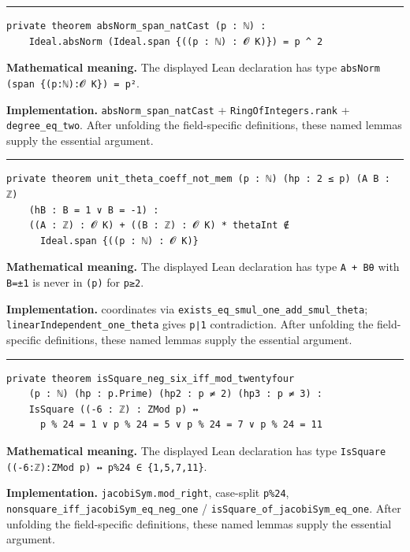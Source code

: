 \documentclass[UTF8,a4paper,11pt,fontset=fandol]{ctexart}
\theoremstyle{definition}
\newcommand{\statementsep}{\par\medskip\hrule\medskip}
\begin{document}
\statementsep
\begin{verbatim}
private theorem absNorm_span_natCast (p : ℕ) :
    Ideal.absNorm (Ideal.span {((p : ℕ) : 𝓞 K)}) = p ^ 2
\end{verbatim}
\noindent\textbf{Mathematical meaning.} The displayed Lean declaration has type \texttt{absNorm (span \{(p:ℕ):𝓞 K\}) = p²}.\par
\noindent\textbf{Implementation.} \texttt{absNorm\_\allowbreak{}span\_\allowbreak{}natCast} + \texttt{RingOfIntegers.\allowbreak{}rank} + \texttt{degree\_\allowbreak{}eq\_\allowbreak{}two}. After unfolding the field-specific definitions, these named lemmas supply the essential argument.\par
\statementsep
\begin{verbatim}
private theorem unit_theta_coeff_not_mem (p : ℕ) (hp : 2 ≤ p) (A B : ℤ)
    (hB : B = 1 ∨ B = -1) :
    ((A : ℤ) : 𝓞 K) + ((B : ℤ) : 𝓞 K) * thetaInt ∉
      Ideal.span {((p : ℕ) : 𝓞 K)}
\end{verbatim}
\noindent\textbf{Mathematical meaning.} The displayed Lean declaration has type \texttt{A + Bθ} with \texttt{B=±1} is never in \texttt{(p)} for \texttt{p≥2}.\par
\noindent\textbf{Implementation.} coordinates via \texttt{exists\_\allowbreak{}eq\_\allowbreak{}smul\_\allowbreak{}one\_\allowbreak{}add\_\allowbreak{}smul\_\allowbreak{}theta}; \texttt{linearIndependent\_\allowbreak{}one\_\allowbreak{}theta} gives \texttt{p∣1} contradiction. After unfolding the field-specific definitions, these named lemmas supply the essential argument.\par
\statementsep
\begin{verbatim}
private theorem isSquare_neg_six_iff_mod_twentyfour
    (p : ℕ) (hp : p.Prime) (hp2 : p ≠ 2) (hp3 : p ≠ 3) :
    IsSquare ((-6 : ℤ) : ZMod p) ↔
      p % 24 = 1 ∨ p % 24 = 5 ∨ p % 24 = 7 ∨ p % 24 = 11
\end{verbatim}
\noindent\textbf{Mathematical meaning.} The displayed Lean declaration has type \texttt{IsSquare ((-6:ℤ):ZMod p) ↔ p\%24 ∈ \{1,5,7,11\}}.\par
\noindent\textbf{Implementation.} \texttt{jacobiSym.\allowbreak{}mod\_\allowbreak{}right}, case-split \texttt{p\%24}, \texttt{nonsquare\_\allowbreak{}iff\_\allowbreak{}jacobiSym\_\allowbreak{}eq\_\allowbreak{}neg\_\allowbreak{}one} / \texttt{isSquare\_\allowbreak{}of\_\allowbreak{}jacobiSym\_\allowbreak{}eq\_\allowbreak{}one}. After unfolding the field-specific definitions, these named lemmas supply the essential argument.\par
\end{document}
